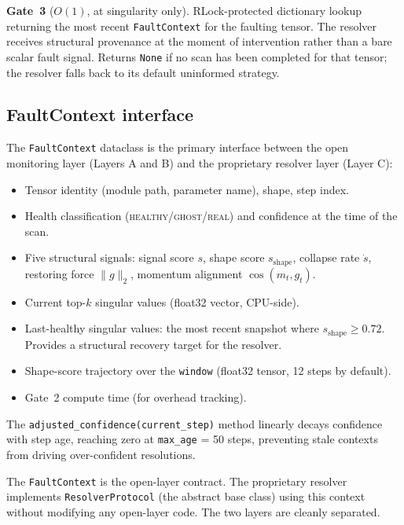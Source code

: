 \documentclass[11pt,a4paper]{article}
\theoremstyle{plain}
\begin{document}
\textbf{Gate~3} ($O(1)$, at singularity only).
RLock-protected dictionary lookup returning the most recent
\texttt{FaultContext} for the faulting tensor.
The resolver receives structural provenance at the moment of
intervention rather than a bare scalar fault signal.
Returns \texttt{None} if no scan has been completed for that tensor;
the resolver falls back to its default uninformed strategy.

\subsection{FaultContext interface}
\label{sec:faultcontext}

The \texttt{FaultContext} dataclass is the primary interface between
the open monitoring layer (Layers A and B) and the proprietary resolver
layer (Layer C):

\begin{itemize}[leftmargin=*,itemsep=1pt]
\item Tensor identity (module path, parameter name), shape, step index.
\item Health classification (\textsc{healthy}/\textsc{ghost}/\textsc{real})
  and confidence at the time of the scan.
\item Five structural signals: signal score $s$, shape score
  $s_\text{shape}$, collapse rate $\dot{s}$, restoring force
  $\|g\|_2$, momentum alignment $\cos(m_t, g_t)$.
\item Current top-$k$ singular values (float32 vector, CPU-side).
\item Last-healthy singular values: the most recent snapshot where
  $s_\text{shape} \geq 0.72$.
  Provides a structural recovery target for the resolver.
\item Shape-score trajectory over the \texttt{window} (float32 tensor,
  12 steps by default).
\item Gate~2 compute time (for overhead tracking).
\end{itemize}

The \texttt{adjusted\_confidence(current\_step)} method linearly decays
confidence with step age, reaching zero at \texttt{max\_age} = 50 steps,
preventing stale contexts from driving over-confident resolutions.

The \texttt{FaultContext} is the open-layer contract.
The proprietary resolver implements \texttt{ResolverProtocol}
(the abstract base class) using this context without modifying any
open-layer code.
The two layers are cleanly separated.
\end{document}

